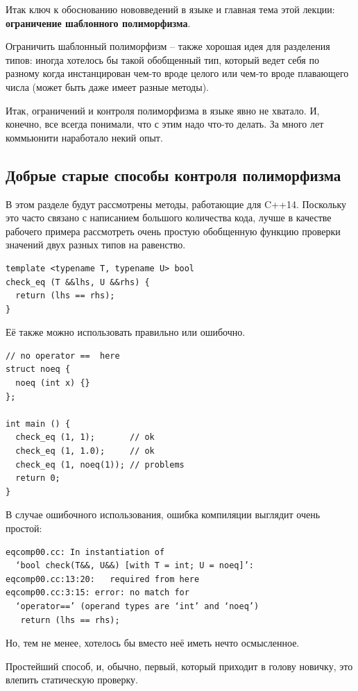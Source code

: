 \documentclass[a4paper,12pt,oneside]{book}
\begin{document}
Итак ключ к обоснованию нововведений в языке и главная тема этой лекции: \textbf{ограничение шаблонного полиморфизма}.

Ограничить шаблонный полиморфизм -- также хорошая идея для разделения типов: иногда хотелось бы такой обобщенный тип, который ведет себя по разному когда инстанцирован чем-то вроде целого или чем-то вроде плавающего числа (может быть даже имеет разные методы).

Итак, ограничений и контроля полиморфизма в языке явно не хватало. И, конечно, все всегда понимали, что с этим надо что-то делать. За много лет коммьюнити наработало некий опыт.

\subsection{Добрые старые способы контроля полиморфизма}

В этом разделе будут рассмотрены методы, работающие для C++14. Поскольку это часто связано с написанием большого количества кода, лучше в качестве рабочего примера рассмотреть очень простую обобщенную функцию проверки значений двух разных типов на равенство.

\begin{lstlisting}
template <typename T, typename U> bool
check_eq (T &&lhs, U &&rhs) {
  return (lhs == rhs);
}
\end{lstlisting}

Её также можно использовать правильно или ошибочно.

\begin{lstlisting}
// no operator ==  here
struct noeq {
  noeq (int x) {}
};

int main () {
  check_eq (1, 1);       // ok
  check_eq (1, 1.0);     // ok
  check_eq (1, noeq(1)); // problems
  return 0;
}
\end{lstlisting}

В случае ошибочного использования, ошибка компиляции выглядит очень простой:

\begin{verbatim}
eqcomp00.cc: In instantiation of 
  ‘bool check(T&&, U&&) [with T = int; U = noeq]’:
eqcomp00.cc:13:20:   required from here
eqcomp00.cc:3:15: error: no match for 
  ‘operator==’ (operand types are ‘int’ and ‘noeq’)
   return (lhs == rhs);
\end{verbatim}

Но, тем не менее, хотелось бы вместо неё иметь нечто осмысленное.

Простейший способ, и, обычно, первый, который приходит в голову новичку, это влепить статическую проверку.
\end{document}
